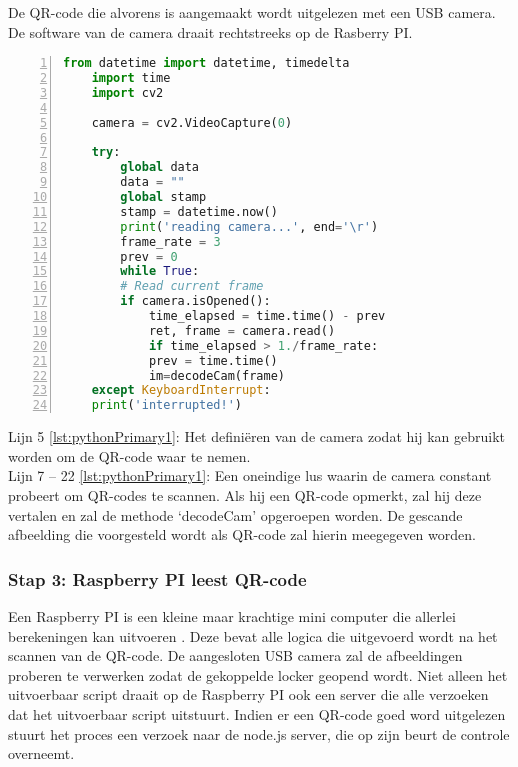 De QR-code die alvorens is aangemaakt wordt uitgelezen met een USB camera. De software van de camera draait rechtstreeks op de Rasberry PI. 
 \begin{lstlisting}[language=Python, caption={Het uitvoerbare script van de QR-unit, die de toegangscode zal uitlezen.}, label={lst:pythonPrimary1}, numbers=left]
    from datetime import datetime, timedelta
    import time
    import cv2
    
    camera = cv2.VideoCapture(0)
    
    try:
        global data
        data = ""
        global stamp
        stamp = datetime.now()
        print('reading camera...', end='\r')
        frame_rate = 3
        prev = 0
        while True:
        # Read current frame
        if camera.isOpened():
            time_elapsed = time.time() - prev
            ret, frame = camera.read()
            if time_elapsed > 1./frame_rate:
            prev = time.time()
            im=decodeCam(frame)
    except KeyboardInterrupt:
    print('interrupted!')
\end{lstlisting}
Lijn 5 \ref{lst:pythonPrimary1}: Het definiëren van de camera zodat hij kan gebruikt worden om de QR-code waar te nemen. \\    
Lijn 7 – 22 \ref{lst:pythonPrimary1}: Een oneindige lus waarin de camera constant probeert om QR-codes te scannen. Als hij een QR-code opmerkt, zal hij deze vertalen en zal de methode ‘decodeCam’ opgeroepen worden. De gescande afbeelding die voorgesteld wordt als QR-code zal hierin meegegeven worden.\\

\subsubsection{Stap 3: Raspberry PI leest QR-code}
Een Raspberry PI is een kleine maar krachtige mini computer die allerlei berekeningen kan uitvoeren \autocite{Richardson2013}. Deze bevat alle logica die uitgevoerd wordt na het scannen van de QR-code.  De aangesloten USB camera zal de afbeeldingen proberen te verwerken zodat de gekoppelde locker geopend wordt. Niet alleen het uitvoerbaar script draait op de Raspberry PI ook een server die alle verzoeken dat het uitvoerbaar script uitstuurt. Indien er een QR-code goed word uitgelezen stuurt het proces een verzoek naar de node.js server, die op zijn beurt de controle overneemt.

